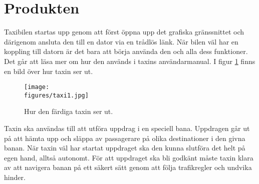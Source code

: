 \documentclass[tekniskrapport/tech.tex]{subfiles}
\begin{document}
\section{Produkten}
Taxibilen startas upp genom att först öppna upp det grafiska gränssnittet och
därigenom ansluta den till en dator via en trådlös länk. När bilen väl har en
koppling till datorn är det bara att börja använda den och alla dess
funktioner. Det går att läsa mer om hur den används i taxins användarmanual. I
figur \ref{fig:taxi1} finns en bild över hur taxin ser ut.

\begin{figure}[H]
    \centering
    \texttt{[image: \\figures/taxi1.jpg]}
    \caption{Hur den färdiga taxin ser ut.}
    \label{fig:taxi1}
\end{figure}

\noindent
Taxin ska användas till att utföra uppdrag i en speciell bana. Uppdragen går ut
på att hämta upp och släppa av passagerare på olika destinationer i den givna
banan. När taxin väl har startat uppdraget ska den kunna slutföra det helt på
egen hand, alltså autonomt. För att uppdraget ska bli godkänt måste taxin klara
av att navigera banan på ett säkert sätt genom att följa trafikregler och
undvika hinder.
\end{document}
